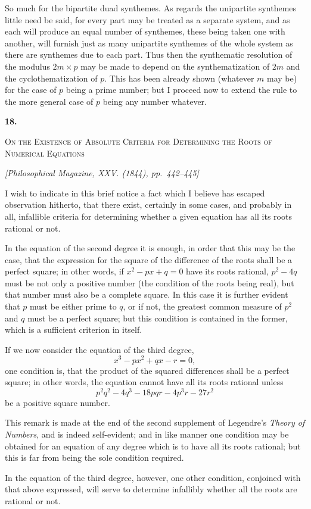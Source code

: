 \documentclass[11pt]{article}
\newcommand{\paperhead}[3]{%
  \clearpage
  \begin{center}
  {\Large\bfseries #1.}\par\vspace{0.85em}
  {\large\scshape #2}\par\vspace{0.6em}
  {\itshape [#3]}\par
  \end{center}\vspace{0.4em}}
\newcommand{\sourcepage}[1]{\marginpar{\scriptsize p.~#1}}
\begin{document}
So much for the bipartite duad synthemes. As regards the unipartite synthemes little need be said, for every part may be treated as a separate system, and as each will produce an equal number of synthemes, these being taken one with another, will furnish just as many unipartite synthemes of the whole system as there are synthemes due to each part. Thus then the synthematic resolution of the modulus $2m\times p$ may be made to depend on the synthematization of $2m$ and the cyclothematization of $p$. This has been already shown (whatever $m$ may be) for the case of $p$ being a prime number; but I proceed now to extend the rule to the more general case of $p$ being any number whatever.

\paperhead{18}{On the Existence of Absolute Criteria for Determining the Roots of Numerical Equations}{Philosophical Magazine, XXV. (1844), pp.~442--445}

\sourcepage{103}
I wish to indicate in this brief notice a fact which I believe has escaped observation hitherto, that there exist, certainly in some cases, and probably in all, infallible criteria for determining whether a given equation has all its roots rational or not.

In the equation of the second degree it is enough, in order that this may be the case, that the expression for the square of the difference of the roots shall be a perfect square; in other words, if $x^2-px+q=0$ have its roots rational, $p^2-4q$ must be not only a positive number (the condition of the roots being real), but that number must also be a complete square. In this case it is further evident that $p$ must be either prime to $q$, or if not, the greatest common measure of $p^2$ and $q$ must be a perfect square; but this condition is contained in the former, which is a sufficient criterion in itself.

If we now consider the equation of the third degree,
\[
x^3-px^2+qx-r=0,
\]
one condition is, that the product of the squared differences shall be a perfect square; in other words, the equation cannot have all its roots rational unless
\[
p^2q^2-4q^3-18pqr-4p^3r-27r^2
\]
be a positive square number.

This remark is made at the end of the second supplement of Legendre's \emph{Theory of Numbers}, and is indeed self-evident; and in like manner one condition may be obtained for an equation of any degree which is to have all its roots rational; but this is far from being the sole condition required.

\sourcepage{104}
In the equation of the third degree, however, one other condition, conjoined with that above expressed, will serve to determine infallibly whether all the roots are rational or not.
\end{document}
